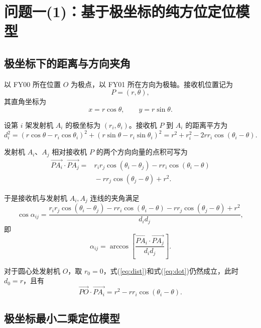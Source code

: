\documentclass[UTF8,a4paper,11pt]{ctexart}
\begin{document}
\section{问题一(1)：基于极坐标的纯方位定位模型}

\subsection{极坐标下的距离与方向夹角}

以 FY00 所在位置 $O$ 为极点，以 FY01 所在方向为极轴。接收机位置记为
\begin{equation}
P=(r,\theta),
\end{equation}
其直角坐标为
\begin{equation}
x=r\cos\theta,\qquad y=r\sin\theta.
\end{equation}

设第 $i$ 架发射机 $A_i$ 的极坐标为 $(r_i,\theta_i)$。接收机 $P$ 到 $A_i$ 的距离平方为
\begin{equation}
d_i^2
=\left(r\cos\theta-r_i\cos\theta_i\right)^2
+\left(r\sin\theta-r_i\sin\theta_i\right)^2
=r^2+r_i^2-2rr_i\cos(\theta_i-\theta).
\label{eq:dist}
\end{equation}

发射机 $A_i$、$A_j$ 相对接收机 $P$ 的两个方向向量的点积可写为
\begin{equation}
\begin{aligned}
\overrightarrow{PA_i}\cdot\overrightarrow{PA_j}
={}&
r_ir_j\cos(\theta_i-\theta_j)
-rr_i\cos(\theta_i-\theta)\\
&{}-rr_j\cos(\theta_j-\theta)+r^2.
\end{aligned}
\label{eq:dot}
\end{equation}

于是接收机与发射机 $A_i,A_j$ 连线的夹角满足
\begin{equation}
\cos\alpha_{ij}
=
\frac{
r_ir_j\cos(\theta_i-\theta_j)
-rr_i\cos(\theta_i-\theta)
-rr_j\cos(\theta_j-\theta)+r^2
}
{d_id_j},
\label{eq:angle_polar}
\end{equation}
即
\begin{equation}
\alpha_{ij}
=
\arccos\left[
\frac{\overrightarrow{PA_i}\cdot\overrightarrow{PA_j}}{d_id_j}
\right].
\end{equation}

对于圆心处发射机 $O$，取 $r_0=0$，式(\ref{eq:dist})和式(\ref{eq:dot})仍然成立，此时
$d_0=r$，且有
\[
\overrightarrow{PO}\cdot\overrightarrow{PA_i}
=r^2-rr_i\cos(\theta_i-\theta).
\]

\subsection{极坐标最小二乘定位模型}
\end{document}
